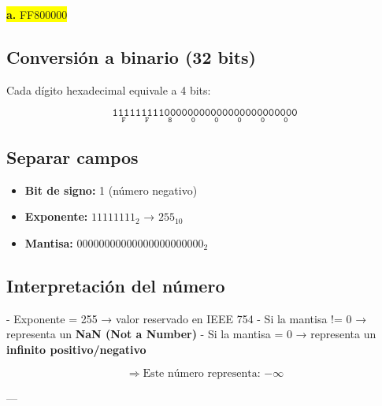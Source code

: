 \documentclass[a4paper,12pt]{article}
\begin{document}
	
	\vspace{1em}
	\begin{center}
	\colorbox{yellow}{\textbf{a.} FF800000}
	\subsection*{Conversión a binario (32 bits)}
	Cada dígito hexadecimal equivale a 4 bits:
	
	\[
		\mathtt{
		\underset{\text{F}}{\boxed{\mathtt{1111}}}
		\underset{\text{F}}{\boxed{\mathtt{1111}}}
		\underset{\text{8}}{\boxed{\mathtt{1000}}}
		\underset{\text{0}}{\boxed{\mathtt{0000}}}
		\underset{\text{0}}{\boxed{\mathtt{0000}}}
		\underset{\text{0}}{\boxed{\mathtt{0000}}}
		\underset{\text{0}}{\boxed{\mathtt{0000}}}
		\underset{\text{0}}{\boxed{\mathtt{0000}}}
		}	
	\]
	
	\subsection*{Separar campos}
	
	\begin{itemize}
		\item \textbf{Bit de signo:} 1 (número negativo)
		\item \textbf{Exponente:} $11111111_2$ → $255_{10}$
		\item \textbf{Mantisa:} $00000000000000000000000_2$ 
	\end{itemize}
	
	\subsection*{Interpretación del número}
	
	- Exponente = 255 → valor reservado en IEEE 754\newline
	- Si la mantisa != 0 → representa un \textbf{NaN (Not a Number)}\newline
	- Si la mantisa = 0 → representa un \textbf{infinito positivo/negativo}
	
	\[
	\Rightarrow \text{Este número representa: } \boxed{-\infty}
	\]
	
	---
	\end{center}
\end{document}
